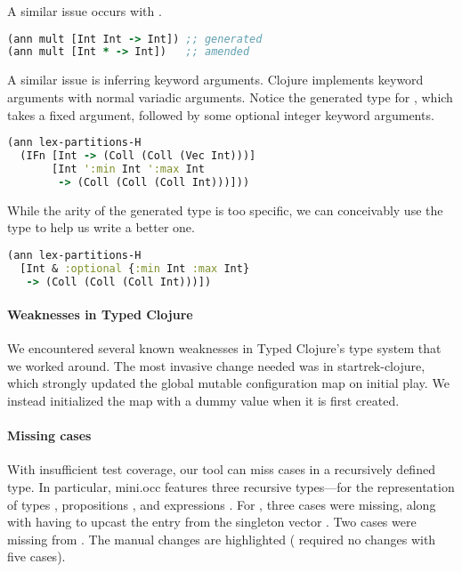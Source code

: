A similar issue occurs with .

\begin{lstlisting}[language=Clojure]
(ann mult [Int Int -> Int]) ;; generated
(ann mult [Int * -> Int])   ;; amended
\end{lstlisting}

A similar issue is inferring keyword arguments. Clojure implements
keyword arguments with normal variadic arguments. Notice
the generated type for ,
which takes a fixed argument, followed by some optional integer keyword
arguments. 

\begin{lstlisting}[language=Clojure]
(ann lex-partitions-H
  (IFn [Int -> (Coll (Coll (Vec Int)))]
       [Int ':min Int ':max Int 
        -> (Coll (Coll (Coll Int)))]))
\end{lstlisting}

While the arity of the generated type is too specific,
we can conceivably use the type to help us write a better one.

\begin{lstlisting}[language=Clojure]
(ann lex-partitions-H
  [Int & :optional {:min Int :max Int}
   -> (Coll (Coll (Coll Int)))])
\end{lstlisting}

\paragraph{Weaknesses in Typed Clojure}

We encountered several known weaknesses in Typed Clojure's type system
that we worked around.
%
The most invasive change needed was in startrek-clojure, which
strongly updated the global mutable configuration map on initial
play. We instead initialized the map with a dummy
value when it is first created.

\paragraph{Missing  cases}

With insufficient test coverage, our tool can miss cases in a recursively defined
type.
In particular, mini.occ features three recursive types---for the representation
of types , propositions , and expressions .
For , three cases were missing, along with having to upcast the 
entry from the singleton vector .
Two cases were missing from .
The manual changes are highlighted ( required no changes with five cases).

